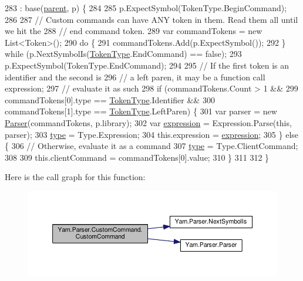 \begin{DoxyCode}
283                                                                : base(\hyperlink{a00142_af313a82103fcc2ff5a177dbb06b92f7b}{parent}, p) \{
284 
285                 p.ExpectSymbol(TokenType.BeginCommand);
286 
287                 \textcolor{comment}{// Custom commands can have ANY token in them. Read them all until we hit the}
288                 \textcolor{comment}{// end command token.}
289                 var commandTokens = \textcolor{keyword}{new} List<Token>();
290                 \textcolor{keywordflow}{do} \{
291                     commandTokens.Add(p.ExpectSymbol());
292                 \} \textcolor{keywordflow}{while} (p.NextSymbolIs(\hyperlink{a00045_a301aa7c866593a5b625a8fc158bbeace}{TokenType}.EndCommand) == \textcolor{keyword}{false});
293                 p.ExpectSymbol(TokenType.EndCommand);
294 
295                 \textcolor{comment}{// If the first token is an identifier and the second is}
296                 \textcolor{comment}{// a left paren, it may be a function call expression;}
297                 \textcolor{comment}{// evaluate it as such}
298                 \textcolor{keywordflow}{if} (commandTokens.Count > 1 &&
299                     commandTokens[0].type == \hyperlink{a00045_a301aa7c866593a5b625a8fc158bbeace}{TokenType}.Identifier &&
300                     commandTokens[1].type == \hyperlink{a00045_a301aa7c866593a5b625a8fc158bbeace}{TokenType}.LeftParen) \{
301                     var parser = \textcolor{keyword}{new} \hyperlink{a00143_acd2714b911fb5e7c38f0e07a9dc1af58}{Parser}(commandTokens, p.library);
302                     var \hyperlink{a00077_a4250d192d5b58e2404a14c68eb616f16}{expression} = Expression.Parse(\textcolor{keyword}{this}, parser);
303                     \hyperlink{a00077_a5ef3bc96812be224d91548bfcdfd4b92}{type} = Type.Expression;
304                     this.expression = \hyperlink{a00077_a4250d192d5b58e2404a14c68eb616f16}{expression};
305                 \} \textcolor{keywordflow}{else} \{
306                     \textcolor{comment}{// Otherwise, evaluate it as a command}
307                     \hyperlink{a00077_a5ef3bc96812be224d91548bfcdfd4b92}{type} = Type.ClientCommand;
308 
309                     this.clientCommand = commandTokens[0].value;
310                 \}
311 
312             \}
\end{DoxyCode}


Here is the call graph for this function\-:
\nopagebreak
\begin{figure}[H]
\begin{center}
\leavevmode
\includegraphics[width=350pt]{a00077_a49150c9046dcad61d61ce35c51816313_cgraph}
\end{center}
\end{figure}




